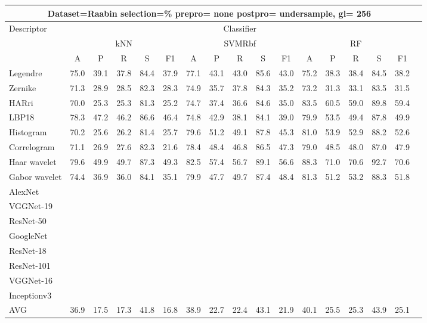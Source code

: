 \documentclass[12pt,italian]{article}
\begin{document}
\begin{tiny}
\begin{longtable}{lcccccccccccccccc}
\toprule
\multicolumn{16}{c}{Dataset=Raabin selection=\% prepro= none postpro= undersample, gl= 256} \\ 
\toprule
Descriptor & \multicolumn{15}{c}{Classifier} \\ 
& \multicolumn{5}{c}{kNN} & \multicolumn{5}{c}{SVMRbf} & \multicolumn{5}{c}{RF} \\ 
& A & P & R & S & F1 & A & P & R & S & F1 & A & P & R & S & F1 \\ 
\midrule
Legendre & 75.0 & 39.1 & 37.8 & 84.4 & 37.9 & 77.1 & 43.1 & 43.0 & 85.6 & 43.0 & 75.2 & 38.3 & 38.4 & 84.5 & 38.2 \\ 
Zernike & 71.3 & 28.9 & 28.5 & 82.3 & 28.3 & 74.9 & 35.7 & 37.8 & 84.3 & 35.2 & 73.2 & 31.3 & 33.1 & 83.5 & 31.5 \\ 
HARri & 70.0 & 25.3 & 25.3 & 81.3 & 25.2 & 74.7 & 37.4 & 36.6 & 84.6 & 35.0 & 83.5 & 60.5 & 59.0 & 89.8 & 59.4 \\ 
LBP18 & 78.3 & 47.2 & 46.2 & 86.6 & 46.4 & 74.8 & 42.9 & 38.1 & 84.1 & 39.0 & 79.9 & 53.5 & 49.4 & 87.8 & 49.9 \\ 
Histogram & 70.2 & 25.6 & 26.2 & 81.4 & 25.7 & 79.6 & 51.2 & 49.1 & 87.8 & 45.3 & 81.0 & 53.9 & 52.9 & 88.2 & 52.6 \\ 
Correlogram & 71.1 & 26.9 & 27.6 & 82.3 & 21.6 & 78.4 & 48.4 & 46.8 & 86.5 & 47.3 & 79.0 & 48.5 & 48.0 & 87.0 & 47.9 \\ 
Haar wavelet & 79.6 & 49.9 & 49.7 & 87.3 & 49.3 & 82.5 & 57.4 & 56.7 & 89.1 & 56.6 & 88.3 & 71.0 & 70.6 & 92.7 & 70.6 \\ 
Gabor wavelet & 74.4 & 36.9 & 36.0 & 84.1 & 35.1 & 79.9 & 47.7 & 49.7 & 87.4 & 48.4 & 81.3 & 51.2 & 53.2 & 88.3 & 51.8 \\ 
AlexNet \\ 
VGGNet-19 \\ 
ResNet-50 \\ 
GoogleNet \\ 
ResNet-18 \\ 
ResNet-101 \\ 
VGGNet-16 \\ 
Inceptionv3 \\ 
\hline
AVG & 36.9 & 17.5 & 17.3 & 41.8 & 16.8 & 38.9 & 22.7 & 22.4 & 43.1 & 21.9 & 40.1 & 25.5 & 25.3 & 43.9 & 25.1 \\ 
\hline
\bottomrule
\end{longtable} 


\end{tiny}
\end{document}
